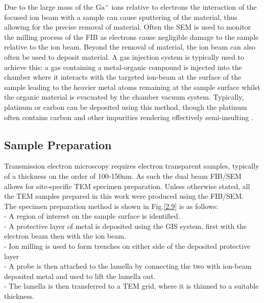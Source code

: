 Due to the large mass of the $\mathrm{Ga^{+}}$ ions relative to electrons the interaction of the focused ion beam with a sample can cause sputtering of the material, thus allowing for the precise removal of material. Often the SEM is used to monitor the milling process of the FIB as electrons cause negligible damage to the sample relative to the ion beam. Beyond the removal of material, the ion beam can also often be used to deposit material. A gas injection system  is typically used to achieve this: a gas containing a metal-organic compound is injected into the chamber where it interacts with the targeted ion-beam  at the surface of the sample leading to the heavier metal atoms remaining at the sample surface whilst the organic material is evacuated by the chamber vacuum system. Typically, platinum or carbon can be deposited using this method, though the platinum often contains carbon and other impurities rendering effectively semi-insulting \cite{Divitni2012}. 

\subsection{Sample Preparation}
Transmission electron microscopy  requires electron transparent samples, typically of a thickness on the order of 100-150nm. As such the dual beam FIB/SEM allows for site-specific TEM specimen preparation. Unless otherwise stated, all the TEM samples prepared in this work were produced using the FIB/SEM.\\
The specimen preparation method is shown in Fig.\ref{2.9} is as follows:\\
\indent - A region of interest on the sample surface is identified.\\
\indent - A protective layer of metal is deposited using the GIS system, first with the electron beam then with the ion beam.\\
\indent - Ion milling is used to form trenches on either side of the deposited protective layer\\
\indent - A probe is then attached to the lamella by connecting the two with ion-beam deposited metal and used to lift the lamella out.\\
\indent - The lamella is then transferred to a TEM grid, where it is thinned to a suitable thickness.


